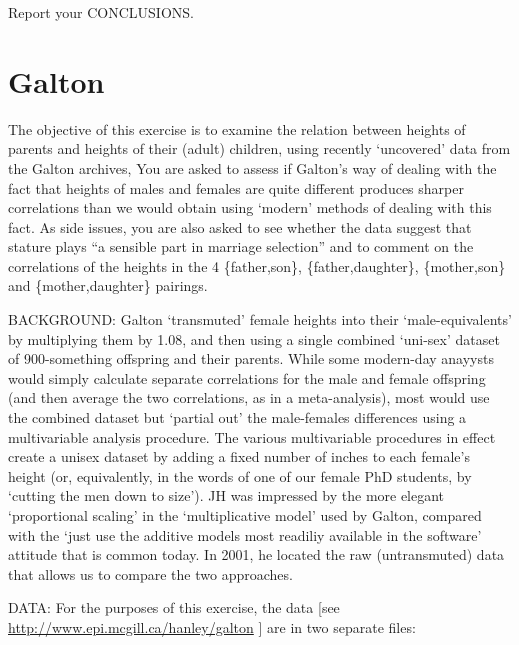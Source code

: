 \documentclass[]{book}
\begin{document}
Report your CONCLUSIONS.

\hypertarget{galton-1}{%
\section{Galton}\label{galton-1}}

The objective of this exercise is to examine the relation between heights of parents and heights of their (adult) children, using recently `uncovered' data from the Galton archives, You are asked to assess if Galton's way of dealing with the fact that heights of males and females are quite different produces sharper correlations than we would obtain using `modern' methods of dealing with this fact. As side issues, you are also asked to see whether the data suggest that stature plays ``a sensible part in marriage selection'' and to comment on the correlations of the heights in the 4 \{father,son\}, \{father,daughter\}, \{mother,son\} and \{mother,daughter\} pairings.

BACKGROUND: Galton `transmuted' female heights into their `male-equivalents' by multiplying them by 1.08, and then using a single combined `uni-sex' dataset of 900-something offspring and their parents. While some modern-day anayysts would simply calculate separate correlations for the male and female offspring (and then average the two correlations, as in a meta-analysis), most would use the combined dataset but `partial out' the male-females differences using a multivariable analysis procedure. The various multivariable procedures in effect create a unisex dataset by adding a fixed number of inches to each female's height (or, equivalently, in the words of one of our female PhD students, by `cutting the men down to size'). JH was impressed by the more elegant `proportional scaling' in the `multiplicative model' used by Galton, compared with the `just use the additive models most readiliy available in the software' attitude that is common today. In 2001, he located the raw (untransmuted) data that allows us to compare the two approaches.

DATA: For the purposes of this exercise, the data {[}see \url{http://www.epi.mcgill.ca/hanley/galton} {]} are in two separate files:
\end{document}

